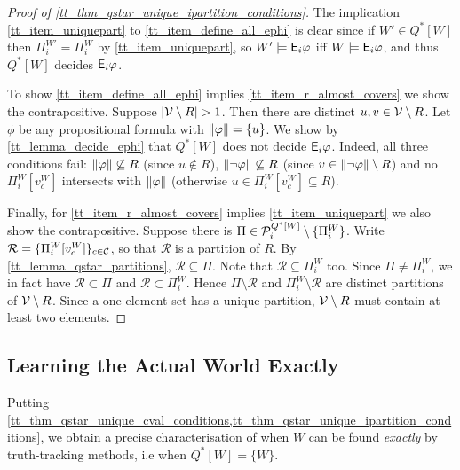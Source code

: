 \begin{proof}[Proof of \cref{tt_thm_qstar_unique_ipartition_conditions}]

    The implication \cref{tt_item_uniquepart} to \cref{tt_item_define_all_ephi} is
    clear since if $W' \in Q^*[W]$ then $\Pi^{W'}_i = \Pi^W_i$ by
    \cref{tt_item_uniquepart}, so $W' \models \mathsf{E}_i\varphi$ iff $W \models \mathsf{E}_i\varphi$,
    and thus $Q^*[W]$ decides $\mathsf{E}_i\varphi$.

    To show \cref{tt_item_define_all_ephi} implies \cref{tt_item_r_almost_covers} we
    show the contrapositive. Suppose $|\mathcal{V} \setminus R| > 1$. Then there are
    distinct $u, v \in \mathcal{V} \setminus R$. Let $\phi$ be any propositional
    formula with $\|{\varphi}\| = \{u\}$. We show by \cref{tt_lemma_decide_ephi}
    that $Q^*[W]$ does not decide $\mathsf{E}_i\varphi$. Indeed, all three conditions
    fail: $\|{\varphi}\| \not\subseteq R$ (since $u \notin R$),
    $\|{\neg\varphi}\| \not\subseteq R$ (since $v \in \|{\neg\varphi}\|
    \setminus R$) and no $\Pi^W_i[v^W_c]$ intersects with $\|{\varphi}\|$
    (otherwise $u \in \Pi^W_i[v^W_c] \subseteq R$).

    Finally, for \cref{tt_item_r_almost_covers} implies \cref{tt_item_uniquepart} we
    also show the contrapositive. Suppose there is $\Pi \in \mathcal{P}^{Q^*[W]}_i
    \setminus \{\Pi^W_i\}$. Write $\mathcal{R} = \{\Pi^W_i[v^W_c]\}_{c \in
    \mathcal{C}}$, so that $\mathcal{R}$ is a partition of $R$. By
    \cref{tt_lemma_qstar_partitions}, $\mathcal{R} \subseteq \Pi$. Note that
    $\mathcal{R} \subseteq \Pi^W_i$ too. Since $\Pi \ne \Pi^W_i$, we in fact
    have $\mathcal{R} \subset \Pi$ and $\mathcal{R} \subset \Pi^W_i$. Hence
    $\Pi \setminus \mathcal{R}$ and $\Pi^W_i \setminus \mathcal{R}$ are
    distinct partitions of $\mathcal{V} \setminus R$. Since a one-element set has a
    unique partition, $\mathcal{V} \setminus R$ must contain at least two elements.
\end{proof}

\subsection{Learning the Actual World Exactly}

Putting
\cref{tt_thm_qstar_unique_cval_conditions,tt_thm_qstar_unique_ipartition_conditions},
we obtain a precise characterisation of when $W$ can be found \emph{exactly} by
truth-tracking methods, i.e when $Q^*[W] = \{W\}$.

